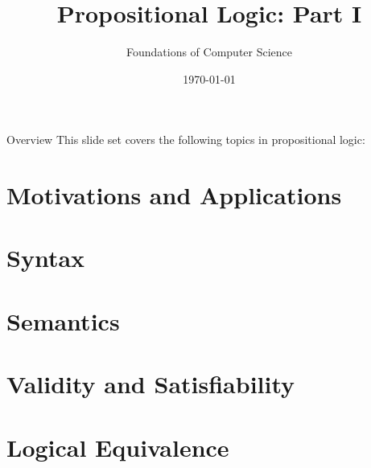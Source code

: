\documentclass[style=sailor,size=12pt]{powerdot}
\title{Propositional Logic: Part I}
\author{Foundations of Computer Science}
\date{\today}
\begin{document}
\maketitle
\begin{slide}[toc=,bm=]{Overview}
This slide set covers the following topics in propositional logic:

\vspace{5mm}
\tableofcontents[content=sections]
\end{slide}

\section[slide=true]{Motivations and Applications}


\section[slide=true]{Syntax}


\section[slide=true]{Semantics}


\section[slide=true]{Validity and Satisfiability}


\section[slide=true]{Logical Equivalence}

\end{document}
